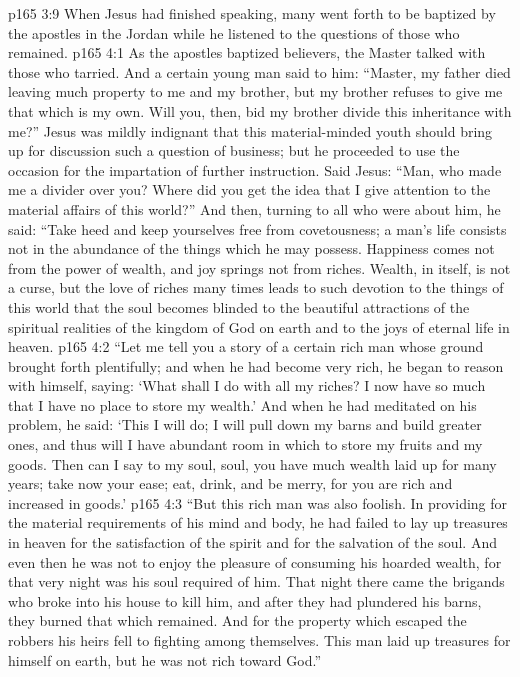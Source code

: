 \pc \vs p165 3:9 When Jesus had finished speaking, many went forth to be baptized by the apostles in the Jordan while he listened to the questions of those who remained.
\vs p165 4:1 As the apostles baptized believers, the Master talked with those who tarried. And a certain young man said to him: “Master, my father died leaving much property to me and my brother, but my brother refuses to give me that which is my own. Will you, then, bid my brother divide this inheritance with me?” Jesus was mildly indignant that this material\hyp{}minded youth should bring up for discussion such a question of business; but he proceeded to use the occasion for the impartation of further instruction. Said Jesus: \textcolor{ubdarkred}{“Man, who made me a divider over you? Where did you get the idea that I give attention to the material affairs of this world?”} And then, turning to all who were about him, he said: \textcolor{ubdarkred}{“Take heed and keep yourselves free from covetousness; a man’s life consists not in the abundance of the things which he may possess. Happiness comes not from the power of wealth, and joy springs not from riches. Wealth, in itself, is not a curse, but the love of riches many times leads to such devotion to the things of this world that the soul becomes blinded to the beautiful attractions of the spiritual realities of the kingdom of God on earth and to the joys of eternal life in heaven.}
\pc \vs p165 4:2 \textcolor{ubdarkred}{“Let me tell you a story of a certain rich man whose ground brought forth plentifully; and when he had become very rich, he began to reason with himself, saying: ‘What shall I do with all my riches? I now have so much that I have no place to store my wealth.’ And when he had meditated on his problem, he said: ‘This I will do; I will pull down my barns and build greater ones, and thus will I have abundant room in which to store my fruits and my goods. Then can I say to my soul, soul, you have much wealth laid up for many years; take now your ease; eat, drink, and be merry, for you are rich and increased in goods.’}\plusone
\vs p165 4:3 \textcolor{ubdarkred}{“But this rich man was also foolish. In providing for the material requirements of his mind and body, he had failed to lay up treasures in heaven for the satisfaction of the spirit and for the salvation of the soul. And even then he was not to enjoy the pleasure of consuming his hoarded wealth, for that very night was his soul required of him. That night there came the brigands who broke into his house to kill him, and after they had plundered his barns, they burned that which remained. And for the property which escaped the robbers his heirs fell to fighting among themselves. This man laid up treasures for himself on earth, but he was not rich toward God.”}
